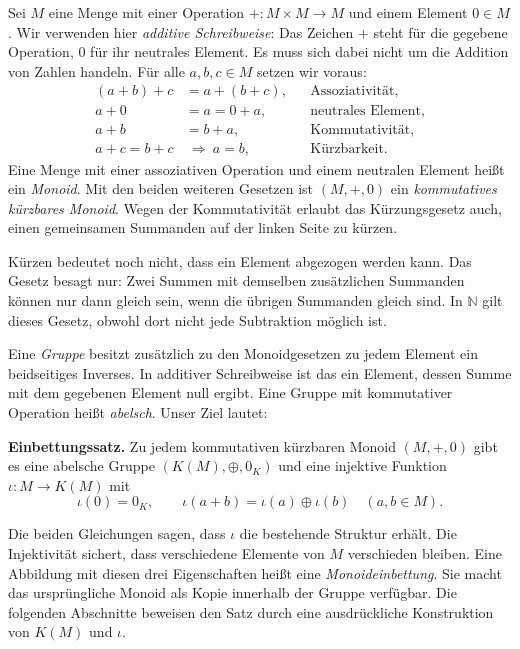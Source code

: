 Sei \(M\) eine Menge mit einer Operation
\(+\colon M\times M\to M\) und einem Element \(0\in M\).
Wir verwenden hier \emph{additive Schreibweise}: Das Zeichen \(+\)
steht für die gegebene Operation, \(0\) für ihr neutrales Element.
Es muss sich dabei nicht um die Addition von Zahlen handeln.
Für alle \(a,b,c\in M\) setzen wir voraus:
\[
  \begin{aligned}
    (a+b)+c&=a+(b+c), &&\text{Assoziativität,}\\
    a+0&=a=0+a, &&\text{neutrales Element,}\\
    a+b&=b+a, &&\text{Kommutativität,}\\
    a+c=b+c&\ \Longrightarrow\ a=b,
      &&\text{Kürzbarkeit.}
  \end{aligned}
\]
Eine Menge mit einer assoziativen Operation und einem neutralen
Element heißt ein \emph{Monoid}. Mit den beiden weiteren Gesetzen
ist \((M,+,0)\) ein \emph{kommutatives kürzbares Monoid}.
Wegen der Kommutativität erlaubt das Kürzungsgesetz auch, einen
gemeinsamen Summanden auf der linken Seite zu kürzen.

Kürzen bedeutet noch nicht, dass ein Element abgezogen werden kann.
Das Gesetz besagt nur: Zwei Summen mit demselben zusätzlichen
Summanden können nur dann gleich sein, wenn die übrigen Summanden
gleich sind. In \(\mathbb N\) gilt dieses Gesetz, obwohl dort
nicht jede Subtraktion möglich ist.

Eine \emph{Gruppe} besitzt zusätzlich zu den Monoidgesetzen zu
jedem Element ein beidseitiges Inverses. In additiver Schreibweise
ist das ein Element, dessen Summe mit dem gegebenen Element null
ergibt. Eine Gruppe mit kommutativer Operation heißt
\emph{abelsch}. Unser Ziel lautet:

\medskip\noindent\textbf{Einbettungssatz.}
Zu jedem kommutativen kürzbaren Monoid \((M,+,0)\) gibt es eine
abelsche Gruppe \((K(M),\oplus,0_K)\) und eine injektive Funktion
\(\iota\colon M\to K(M)\) mit
\[
  \iota(0)=0_K,
  \qquad
  \iota(a+b)=\iota(a)\oplus\iota(b)
  \quad(a,b\in M).
\]

Die beiden Gleichungen sagen, dass \(\iota\) die bestehende
Struktur erhält. Die Injektivität sichert, dass verschiedene
Elemente von \(M\) verschieden bleiben. Eine Abbildung mit diesen
drei Eigenschaften heißt eine \emph{Monoideinbettung}. Sie macht
das ursprüngliche Monoid als Kopie innerhalb der Gruppe verfügbar.
Die folgenden Abschnitte beweisen den Satz durch eine ausdrückliche
Konstruktion von \(K(M)\) und \(\iota\).

\par{}
\hypertarget{differences.reading.pairs}{}
